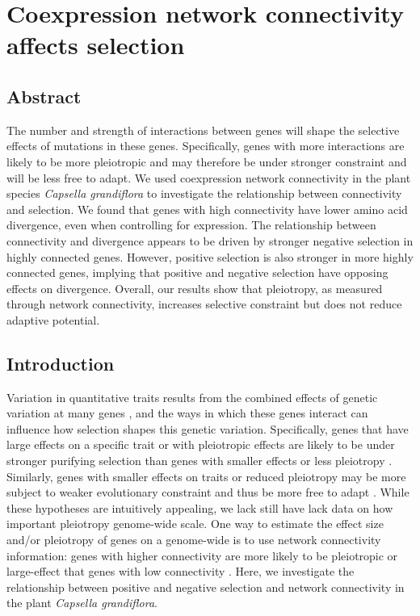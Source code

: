 \setlength{\parindent}{0ex}
\setlength{\parskip}{2ex}

\chapter{Coexpression network connectivity affects selection}

\section{Abstract}
The number and strength of interactions between genes will shape the selective effects of mutations in these genes. Specifically, genes with more interactions are likely to be more pleiotropic and may therefore be under stronger constraint and will be less free to adapt. We used coexpression network connectivity in the plant species \textit{Capsella grandiflora} to investigate the relationship between connectivity and selection. We found that genes with high connectivity have lower amino acid divergence, even when controlling for expression. The relationship between connectivity and divergence appears to be driven by stronger negative selection in highly connected genes. However, positive selection is also stronger in more highly connected genes, implying that positive and negative selection have opposing effects on divergence. Overall, our results show that pleiotropy, as measured through network connectivity, increases selective constraint but does not reduce adaptive potential.

\section{Introduction}

Variation in quantitative traits results from the combined effects of genetic variation at many genes \citep{lynch1998}, and the ways in which these genes interact can influence how selection shapes this genetic variation. Specifically, genes that have large effects on a specific trait or with pleiotropic effects are likely to be under stronger purifying selection than genes with smaller effects or less pleiotropy \citep{orr2000, stern2008}. Similarly, genes with smaller effects on traits or reduced pleiotropy may be more subject to weaker evolutionary constraint and thus be more free to adapt \citep{orr2000, stern2008}. While these hypotheses are intuitively appealing, we lack still have lack data on how important pleiotropy genome-wide scale. One way to estimate the effect size and/or pleiotropy of genes on a genome-wide is to use network connectivity information: genes with higher connectivity are more likely to be pleiotropic or large-effect that genes with low connectivity \citep{he2006}. Here, we investigate the relationship between positive and negative selection and network connectivity in the plant \textit{Capsella grandiflora}.


